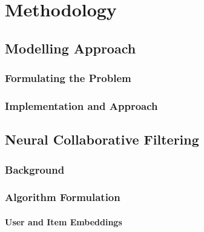 \chapter{Methodology} %
\label{Chapter4}





\section{Modelling Approach}
\label{sec:Modelling Approach}

\subsection{Formulating the Problem}
\label{subsec:Formulating the Problem}

\subsection{Implementation and Approach}
\label{subsec:Implementation and Approach}























\section{Neural Collaborative Filtering}
\label{sec:Neural Collaborative Filtering}

\subsection{Background}
\label{subsec:Background}

\subsection{Algorithm Formulation}
\label{subsec:Algorithm Formulation for NCF}

\subsubsection{User and Item Embeddings}
\label{subsubsec:User and Item Embeddings}

